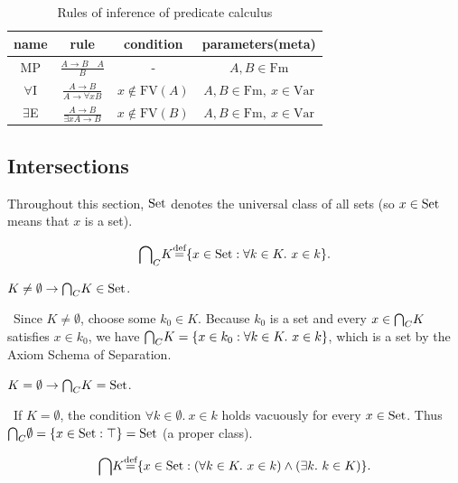 \documentclass[10pt,a4paper]{article}
\begin{document}
\begin{table}[H]
\centering
\caption{Rules of inference of predicate calculus}
\label{tab:rulestab}
\begin{tabular}{|c|c|c|c|}
\hline
name & rule & condition & parameters(meta) \\ \hline
\hline
MP & \rule[-2.5ex]{0pt}{7ex} $\frac{A\to B\quad A}{B}$ & - & $A,B \in \textrm{Fm}$ \\ \hline
\hline
\rule[-2.5ex]{0pt}{7ex}
$\forall$I & $\frac{A\to B}{A\to \forall x B}$ & $x \notin \textrm{FV}(A)$ & $A,B \in \textrm{Fm},\ x \in \textrm{Var}$ \\ \hline
\hline
\rule[-2.5ex]{0pt}{7ex}
$\exists$E & $\frac{A\to B}{\exists x A\to B}$ & $x \notin \textrm{FV}(B)$ & $A,B \in \textrm{Fm},\ x \in \textrm{Var}$ \\ \hline
\end{tabular}
\end{table}

\subsection{Intersections}
Throughout this section, ${\textrm{Set}}$ denotes the universal class of all sets (so $x \in {\textrm{Set}}$ means that $x$ is a set).

\begin{definition}
$${{\bigcap}_C} K {\stackrel{{\textrm{def}}}{=}} \{x \in {\textrm{Set}} : \forall k\in K.\ x\in k\}.$$
\end{definition}

\begin{exercise}
$K\neq \emptyset \to {{\bigcap}_C} K \in {\textrm{Set}}$.
\end{exercise}
\myprf\ Since $K \neq \emptyset$, choose some $k_0 \in K$. Because $k_0$ is a set and every $x \in {{\bigcap}_C} K$ satisfies $x \in k_0$, we have ${{\bigcap}_C} K = \{x \in k_0 : \forall k\in K.\ x\in k\}$, which is a set by the Axiom Schema of Separation. \myqed

\begin{exercise}
$K=\emptyset \to {{\bigcap}_C} K = {\textrm{Set}}$.
\end{exercise}
\myprf\ If $K = \emptyset$, the condition $\forall k \in \emptyset.\ x \in k$ holds vacuously for every $x \in {\textrm{Set}}$. Thus ${{\bigcap}_C} \emptyset = \{x \in {\textrm{Set}} : \top\} = {\textrm{Set}}$ (a proper class). \myqed

\begin{definition}
$${\bigcap} K {\stackrel{{\textrm{def}}}{=}} \{x \in {\textrm{Set}} : (\forall k\in K.\ x\in k)\land (\exists k.\ k\in K)\}.$$
\end{definition}
\end{document}
